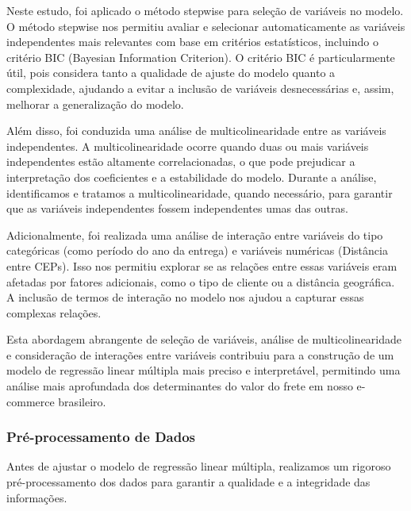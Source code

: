 \documentclass[
]{article}
\begin{document}
Neste estudo, foi aplicado o método stepwise para seleção de variáveis
no modelo. O método stepwise nos permitiu avaliar e selecionar
automaticamente as variáveis independentes mais relevantes com base em
critérios estatísticos, incluindo o critério BIC (Bayesian Information
Criterion). O critério BIC é particularmente útil, pois considera tanto
a qualidade de ajuste do modelo quanto a complexidade, ajudando a evitar
a inclusão de variáveis desnecessárias e, assim, melhorar a
generalização do modelo.

Além disso, foi conduzida uma análise de multicolinearidade entre as
variáveis independentes. A multicolinearidade ocorre quando duas ou mais
variáveis independentes estão altamente correlacionadas, o que pode
prejudicar a interpretação dos coeficientes e a estabilidade do modelo.
Durante a análise, identificamos e tratamos a multicolinearidade, quando
necessário, para garantir que as variáveis independentes fossem
independentes umas das outras.

Adicionalmente, foi realizada uma análise de interação entre variáveis
do tipo categóricas (como período do ano da entrega) e variáveis
numéricas (Distância entre CEPs). Isso nos permitiu explorar se as
relações entre essas variáveis eram afetadas por fatores adicionais,
como o tipo de cliente ou a distância geográfica. A inclusão de termos
de interação no modelo nos ajudou a capturar essas complexas relações.

Esta abordagem abrangente de seleção de variáveis, análise de
multicolinearidade e consideração de interações entre variáveis
contribuiu para a construção de um modelo de regressão linear múltipla
mais preciso e interpretável, permitindo uma análise mais aprofundada
dos determinantes do valor do frete em nosso e-commerce brasileiro.

\hypertarget{pruxe9-processamento-de-dados}{%
\subsubsection{Pré-processamento de
Dados}\label{pruxe9-processamento-de-dados}}

Antes de ajustar o modelo de regressão linear múltipla, realizamos um
rigoroso pré-processamento dos dados para garantir a qualidade e a
integridade das informações.
\end{document}
